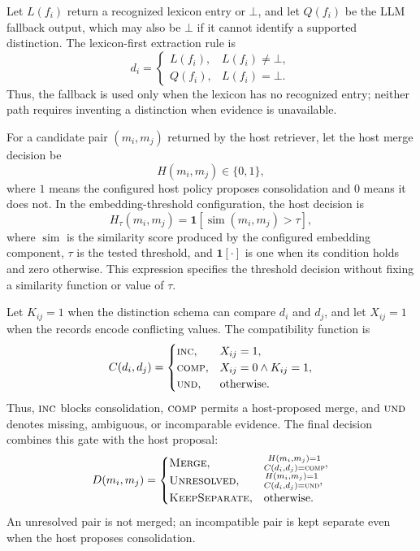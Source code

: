 \documentclass[conference]{IEEEtran}
\newcommand{\Comp}{\textsc{comp}}
\newcommand{\Inc}{\textsc{inc}}
\newcommand{\Und}{\textsc{und}}
\begin{document}
Let $L(f_i)$ return a recognized lexicon entry or $\bot$, and let $Q(f_i)$ be the LLM fallback output, which may also be $\bot$ if it cannot identify a supported distinction. The lexicon-first extraction rule is
\begin{equation}
    d_i =
    \begin{cases}
        L(f_i), & L(f_i) \ne \bot,\\
        Q(f_i), & L(f_i) = \bot.
    \end{cases}
    \label{app:eq:distinction}
\end{equation}
Thus, the fallback is used only when the lexicon has no recognized entry; neither path requires inventing a distinction when evidence is unavailable.

For a candidate pair $(m_i,m_j)$ returned by the host retriever, let the host merge decision be
\begin{equation}
    H(m_i,m_j) \in \{0,1\},
    \label{app:eq:host}
\end{equation}
where $1$ means the configured host policy proposes consolidation and $0$ means it does not. In the embedding-threshold configuration, the host decision is
\begin{equation}
    H_{\tau}(m_i,m_j) = \mathbf{1}\!\left[\operatorname{sim}(m_i,m_j)>\tau\right],
    \label{app:eq:threshold}
\end{equation}
where $\operatorname{sim}$ is the similarity score produced by the configured embedding component, $\tau$ is the tested threshold, and $\mathbf{1}[\cdot]$ is one when its condition holds and zero otherwise. This expression specifies the threshold decision without fixing a similarity function or value of $\tau$.

Let $K_{ij}=1$ when the distinction schema can compare $d_i$ and $d_j$, and let $X_{ij}=1$ when the records encode conflicting values. The compatibility function is
\begin{equation}
    C(d_i,d_j) =
    \begin{cases}
        \Inc, & X_{ij}=1,\\
        \Comp, & X_{ij}=0 \land K_{ij}=1,\\
        \Und, & \text{otherwise}.
    \end{cases}
    \label{app:eq:compatibility}
\end{equation}
Thus, $\Inc$ blocks consolidation, $\Comp$ permits a host-proposed merge, and $\Und$ denotes missing, ambiguous, or incomparable evidence. The final decision combines this gate with the host proposal:
\begin{equation}
    D(m_i,m_j) =
    \begin{cases}
        \textsc{Merge}, & \substack{H(m_i,m_j)=1\\ C(d_i,d_j)=\Comp},\\
        \textsc{Unresolved}, & \substack{H(m_i,m_j)=1\\ C(d_i,d_j)=\Und},\\
        \textsc{KeepSeparate}, & \text{otherwise}.
    \end{cases}
    \label{app:eq:decision}
\end{equation}
An unresolved pair is not merged; an incompatible pair is kept separate even when the host proposes consolidation.
\end{document}
